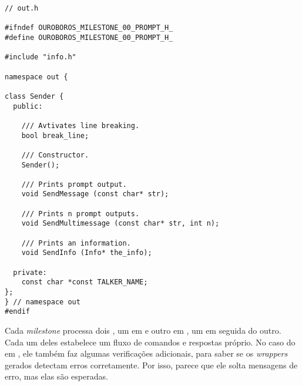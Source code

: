 \vspace{1em}
\begin{lstlisting}
// out.h

#ifndef OUROBOROS_MILESTONE_00_PROMPT_H_
#define OUROBOROS_MILESTONE_00_PROMPT_H_

#include "info.h"

namespace out {

class Sender {
  public:

    /// Avtivates line breaking.
    bool break_line;

    /// Constructor.
    Sender();
    
    /// Prints prompt output.
    void SendMessage (const char* str);
    
    /// Prints n prompt outputs.
    void SendMultimessage (const char* str, int n);

    /// Prints an information.
    void SendInfo (Info* the_info);

  private:
    const char *const TALKER_NAME;
};
} // namespace out
#endif
\end{lstlisting}

Cada \textit{milestone} processa dois , um em
 e outro em , um em seguida do outro.
Cada um deles estabelece um fluxo de comandos e respostas
próprio. No caso do em , ele também faz algumas
verificações adicionais, para saber se os \textit{wrappers}
gerados detectam erros corretamente. Por isso, parece
que ele solta mensagens de erro, mas elas são esperadas.

